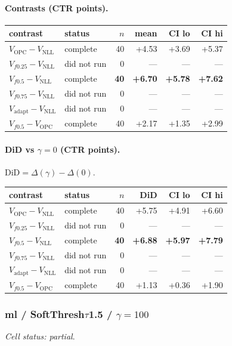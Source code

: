 \documentclass[10pt,a4paper]{article}
\begin{document}
\paragraph{Contrasts (CTR points).}
{\centering\small\begin{tabular}{llrrrr}
\toprule contrast & status & $n$ & mean & CI lo & CI hi \\
\midrule
$V_{\mathrm{OPC}}-V_{\mathrm{NLL}}$ & complete & 40 & +4.53 & +3.69 & +5.37 \\
$V_{f0.25}-V_{\mathrm{NLL}}$ & did not run & 0 & --- & --- & --- \\
\textbf{$V_{f0.5}-V_{\mathrm{NLL}}$} & complete & \textbf{40} & \textbf{+6.70} & \textbf{+5.78} & \textbf{+7.62} \\
$V_{f0.75}-V_{\mathrm{NLL}}$ & did not run & 0 & --- & --- & --- \\
$V_{\mathrm{adapt}}-V_{\mathrm{NLL}}$ & did not run & 0 & --- & --- & --- \\
$V_{f0.5}-V_{\mathrm{OPC}}$ & complete & 40 & +2.17 & +1.35 & +2.99 \\
\bottomrule\end{tabular}\par}
\paragraph{DiD vs $\gamma=0$ (CTR points).} $\mathrm{DiD}=\Delta(\gamma)-\Delta(0)$.
{\centering\small\begin{tabular}{llrrrr}
\toprule contrast & status & $n$ & DiD & CI lo & CI hi \\
\midrule
$V_{\mathrm{OPC}}-V_{\mathrm{NLL}}$ & complete & 40 & +5.75 & +4.91 & +6.60 \\
$V_{f0.25}-V_{\mathrm{NLL}}$ & did not run & 0 & --- & --- & --- \\
\textbf{$V_{f0.5}-V_{\mathrm{NLL}}$} & complete & \textbf{40} & \textbf{+6.88} & \textbf{+5.97} & \textbf{+7.79} \\
$V_{f0.75}-V_{\mathrm{NLL}}$ & did not run & 0 & --- & --- & --- \\
$V_{\mathrm{adapt}}-V_{\mathrm{NLL}}$ & did not run & 0 & --- & --- & --- \\
$V_{f0.5}-V_{\mathrm{OPC}}$ & complete & 40 & +1.13 & +0.36 & +1.90 \\
\bottomrule\end{tabular}\par}
\bigskip
\subsubsection{ml / SoftThresh$\tau$1.5 / $\gamma=100$}
\emph{Cell status: partial}.
\end{document}

